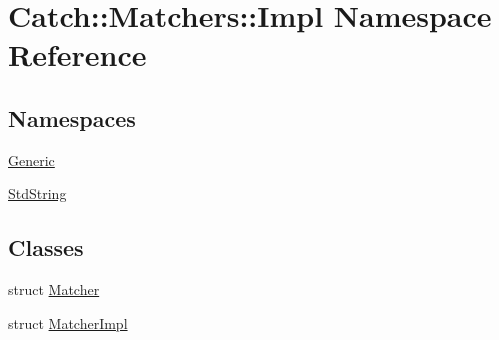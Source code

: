 \hypertarget{namespace_catch_1_1_matchers_1_1_impl}{}\section{Catch\+:\+:Matchers\+:\+:Impl Namespace Reference}
\label{namespace_catch_1_1_matchers_1_1_impl}
\subsection*{Namespaces}
\begin{DoxyCompactItemize}
\item 
 \hyperlink{namespace_catch_1_1_matchers_1_1_impl_1_1_generic}{Generic}
\item 
 \hyperlink{namespace_catch_1_1_matchers_1_1_impl_1_1_std_string}{Std\+String}
\end{DoxyCompactItemize}
\subsection*{Classes}
\begin{DoxyCompactItemize}
\item 
struct \hyperlink{struct_catch_1_1_matchers_1_1_impl_1_1_matcher}{Matcher}
\item 
struct \hyperlink{struct_catch_1_1_matchers_1_1_impl_1_1_matcher_impl}{Matcher\+Impl}
\end{DoxyCompactItemize}
